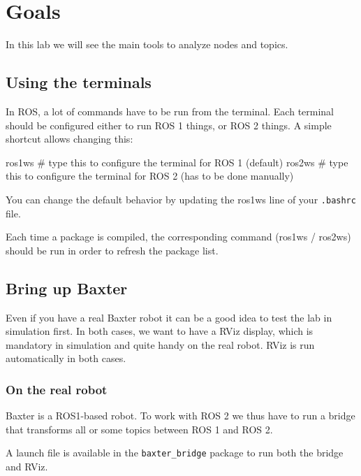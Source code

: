 \documentclass{ecnreport}
\author{O. Kermorgant}
\begin{document}


\section{Goals}

In this lab we will see the main tools to analyze nodes and topics.

\subsection{Using the terminals}

In ROS, a lot of commands have to be run from the terminal. Each terminal should be configured either to run ROS 1 things, or ROS 2 things.
A simple shortcut allows changing this:
\begin{bashcodelarge}
ros1ws  # type this to configure the terminal for ROS 1 (default)
ros2ws  # type this to configure the terminal for ROS 2 (has to be done manually)
\end{bashcodelarge}

You can change the default behavior by updating the ros1ws line of your \texttt{.bashrc} file.

Each time a package is compiled, the corresponding command (ros1ws / ros2ws) should be run in order to refresh the package list.

\subsection{Bring up Baxter}

Even if you have a real Baxter robot it can be a good idea to test the lab in simulation first.
In both cases, we want to have a RViz display, which is mandatory in simulation and quite handy on the real robot. RViz is run automatically in both cases.

\subsubsection{On the real robot}

Baxter is a ROS1-based robot. To work with ROS 2 we thus have to run a bridge that transforms all or some topics between ROS 1 and ROS 2.

A launch file is available in the \texttt{baxter\_bridge} package to run both the bridge and RViz.
\end{document}
